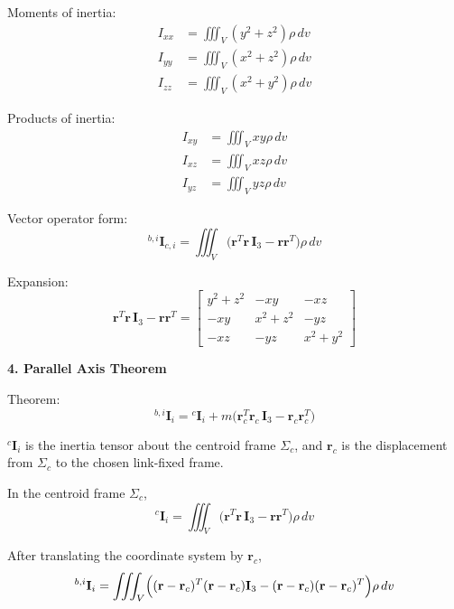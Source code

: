 \documentclass[12pt,a4paper]{report}
\newcommand{\newsymbols}[1]{\par\noindent{}#1\par\vspace{0.35em}}
\newcommand{\vect}[1]{\mathbf{#1}}
\newcommand{\mat}[1]{\mathbf{#1}}
\newcommand{\Frame}[1]{\Sigma_{#1}}
\begin{document}
Moments of inertia:
\begin{align}
I_{xx} &= \iiint_{V} (y^{2} + z^{2})\rho \, dv \\
I_{yy} &= \iiint_{V} (x^{2} + z^{2})\rho \, dv \\
I_{zz} &= \iiint_{V} (x^{2} + y^{2})\rho \, dv
\end{align}

Products of inertia:
\begin{align}
I_{xy} &= \iiint_{V} xy\rho \, dv \\
I_{xz} &= \iiint_{V} xz\rho \, dv \\
I_{yz} &= \iiint_{V} yz\rho \, dv
\end{align}

Vector operator form:
\begin{equation}
{}^{b,i}\mat{I}_{c,i}
=
\iiint_{V}
\bigl(\vect{r}^{T}\vect{r}\,\mat{I}_{3} - \vect{r}\vect{r}^{T}\bigr)\rho \, dv
\end{equation}

Expansion:
\begin{equation}
\vect{r}^{T}\vect{r}\,\mat{I}_{3} - \vect{r}\vect{r}^{T}
=
\begin{bmatrix}
y^{2} + z^{2} & -xy & -xz \\
-xy & x^{2} + z^{2} & -yz \\
-xz & -yz & x^{2} + y^{2}
\end{bmatrix}
\end{equation}

\textbf{4. Parallel Axis Theorem}

Theorem:
\begin{equation}
{}^{b,i}\mat{I}_{i}
=
{}^{c}\mat{I}_{i}
+
m\bigl(\vect{r}_{c}^{T}\vect{r}_{c}\,\mat{I}_{3} - \vect{r}_{c}\vect{r}_{c}^{T}\bigr)
\end{equation}
\newsymbols{${}^{c}\mat{I}_{i}$ is the inertia tensor about the centroid frame $\Frame{c}$, and $\vect{r}_{c}$ is the displacement from $\Frame{c}$ to the chosen link-fixed frame.}

In the centroid frame $\Frame{c}$,
\begin{equation}
{}^{c}\mat{I}_{i}
=
\iiint_{V}
\bigl(\vect{r}^{T}\vect{r}\,\mat{I}_{3} - \vect{r}\vect{r}^{T}\bigr)\rho \, dv
\end{equation}

After translating the coordinate system by $\vect{r}_{c}$,
\begin{equation}
{}^{b,i}\mat{I}_{i}
=
\iiint_{V}
\Bigl(
(\vect{r} - \vect{r}_{c})^{T}(\vect{r} - \vect{r}_{c})\mat{I}_{3}
-
(\vect{r} - \vect{r}_{c})(\vect{r} - \vect{r}_{c})^{T}
\Bigr)\rho \, dv
\end{equation}
\end{document}
